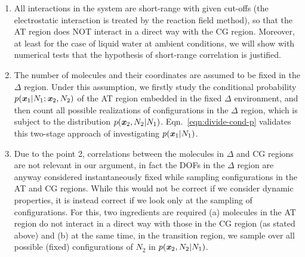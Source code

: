 \documentclass[aip,jcp,a4paper,reprint,onecolumn]{revtex4-1}
\newcommand{\vect}[1]{\textbf{\textit{#1}}}
\newcommand{\HY}{{\Delta}}
\begin{document}
\begin{enumerate}\itemsep -1pt
\item All interactions in the system are short-range with given cut-offs (the
  electrostatic interaction is treated by the reaction field method),
  so that the AT region does NOT interact in a direct way with the CG region.
    Moreover, at least for the case of liquid water at ambient conditions, we will show with numerical tests that the hypothesis of short-range correlation is justified.
\item The number of molecules and their coordinates are assumed to be
  fixed in the $\HY$ region.  Under this assumption, we firstly study
  the conditional probability $p(\vect x_1 | N_1; \vect x_2, N_2)$ of
  the AT region embedded in the fixed $\HY$ environment, and then count
  all possible realizations of configurations in the $\HY$ region, which is subject to
  the distribution $p(\vect x_2, N_2 | N_1)$.
  Eqn.~\eqref{eqn:divide-cond-p} validates this two-stage approach of
  investigating $p(\vect x_1 | N_1)$.
\item Due to the point 2, correlations between the molecules
  in $\HY$ and CG regions are not relevant in our argument, in fact
  the DOFs in the $\HY$ region are anyway considered instantaneously fixed while sampling configurations in the AT and CG regions.
While this would not be correct if we consider dynamic properties, it is instead correct if we look only at the sampling of configurations. For this, two ingredients are required (a) molecules in the AT region do not interact in a direct way with those in the CG region (as stated above) and (b) at the same time, in the transition region, we sample over all possible (fixed) configurations of $N_{2}$ in $p(\vect x_2, N_2 | N_1)$. 
\end{enumerate}
\end{document}
